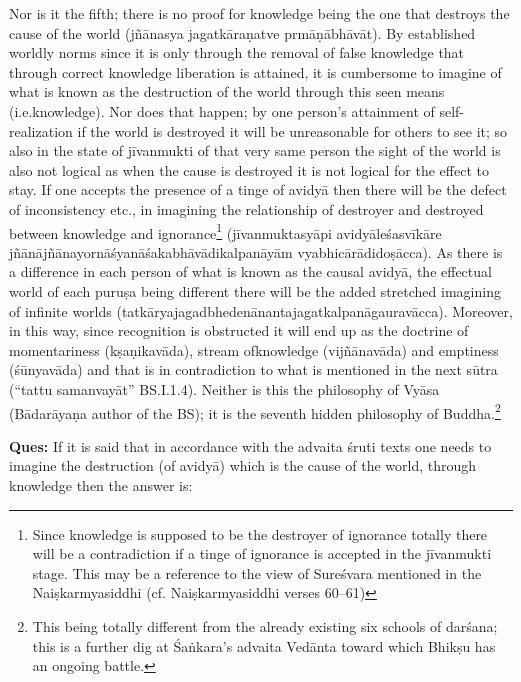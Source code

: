 Nor is it the fifth; there is no proof for knowledge being the one that destroys the cause of the world (jñānasya jagatkāraṇatve prmāṇābhāvāt). By established worldly norms since it is only through the removal of false knowledge that through correct knowledge liberation is attained, it is cumbersome to imagine of what is known as the destruction of the world through this seen means (i.e.knowledge). Nor does that happen; by one person’s attainment of self-realization if the world is destroyed it will be unreasonable for others to see it; so also in the state of jīvanmukti of that very same person the sight of the world is also not logical as when the cause is destroyed it is not logical for the effect to stay. If one accepts the presence of a tinge of avidyā then there will be the defect of inconsistency etc., in imagining the relationship of destroyer and destroyed between knowledge and ignorance\footnote{Since knowledge is supposed to be the destroyer of ignorance totally there will be a contradiction if a tinge of ignorance is accepted in the jīvanmukti stage. This may be a reference to the view of Sureśvara mentioned in the Naiṣkarmyasiddhi (cf. Naiṣkarmyasiddhi verses 60--61)} (jīvanmuktasyāpi avidyāleśasvīkāre jñānājñānayornāśyanāśakabhāvā\-dikalpanāyām vyabhicārādidoṣācca). As there is a difference in each person of what is known as the causal avidyā, the effectual world of each puruṣa being different there will be the added stretched imagining of infinite worlds (tatkāryajagadbhedenānantajagatkalpanāgaura\-vācca). Moreover, in this way, since recognition is obstructed it will end up as the doctrine of momentariness (kṣaṇikavāda), stream of\break knowledge (vijñānavāda) and emptiness (śūnyavāda) and that is in contradiction to what is mentioned in the next sūtra (“tattu samanvayāt” BS.I.1.4). Neither is this the philosophy of Vyāsa (Bādarāyaṇa author of the BS); it is the seventh hidden philosophy of Buddha.\footnote{This being totally different from the already existing six schools of darśana; this is a further dig at Śaṅkara’s advaita Vedānta toward which Bhikṣu has an ongoing battle.}

\textbf{Ques:} If it is said that in accordance with the advaita śruti texts one needs to imagine the destruction (of avidyā) which is the cause of the world, through knowledge then the answer is:

